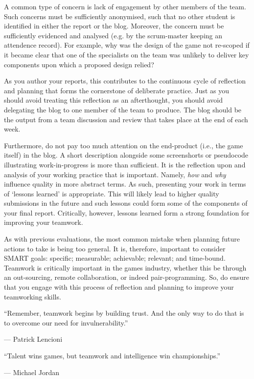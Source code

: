 \documentclass{../fal_assignment}
\begin{document}
A common type of concern is lack of engagement by other members of the team. Such concerns must be sufficiently anonymised, such that no other student is identified in either the report or the blog. Moreover, the concern must be sufficiently evidenced and analysed (e.g. by the scrum-master keeping an attendence record). For example, why was the design of the game not re-scoped if it became clear that one of the specialists on the team was unlikely to deliver key components upon which a proposed design relied?

As you author your reports, this contributes to the continuous cycle of reflection and planning that forms the cornerstone of deliberate practice. Just as you should avoid treating this reflection as an afterthought, you should avoid delegating the blog to one member of the team to produce. The blog should be the output from a team discussion and review that takes place at the end of each week. 

Furthermore, do not pay too much attention on the end-product (i.e., the game itself) in the blog. A short description alongside some screenshorts or pseudocode illustrating work-in-progress is more than sufficient. It is the reflection upon and analysis of your working practice that is important. Namely, \textit{how} and \textit{why} influence quality in more abstract terms. As such, presenting your work in terms of `lessons learned' is appropriate. This will likely lead to higher quality submissions in the future and such lessons could form some of the components of your final report. Critically, however, lessons learned form a strong foundation for improving your teamwork.

As with previous evaluations, the most common mistake when planning future actions to take is being too general. It is, therefore, important to consider SMART goals: specific; measurable; achievable; relevant; and time-bound. Teamwork is critically important in the games industry, whether this be through an out-sourcing, remote collaboration, or indeed pair-programming. So, do ensure that you engage with this process of reflection and planning to improve your teamworking skills.

\begin{marginquote}
    ``Remember, teamwork begins by building trust. And the only way to do that is to overcome our need for invulnerability.''
    
    --- Patrick Lencioni
    
    \marginquoterule

        ``Talent wins games, but teamwork and intelligence win championships.''
    
    --- Michael Jordan
\end{marginquote}
\end{document}
